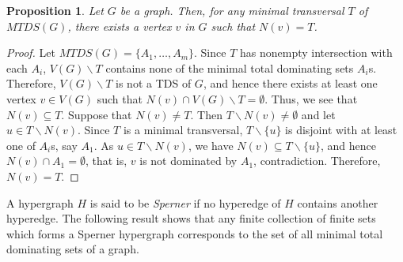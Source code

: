 \documentclass[11pt]{article}
\newtheorem{proposition}[theorem]{Proposition}
\theoremstyle{definition}
\begin{document}
\begin{proposition}\label{prop:transmtdsg}
Let $G$ be a graph.
Then, for any minimal transversal $T$ of $MTDS(G)$, there exists a vertex $v$ in $G$ such that $N(v)=T$.
\end{proposition}
\begin{proof}
Let $MTDS(G)=\{A_1,\dots,A_m\}$.
Since $T$ has nonempty intersection with each $A_i$,
$V(G)\backslash T$ contains none of the minimal total dominating sets $A_i$s.
Therefore, $V(G)\backslash T$ is not a TDS of $G$,
and hence there exists at least one vertex $v\in V(G)$ such that $N(v)\cap V(G)\backslash T=\emptyset$. 
Thus, we see that $N(v)\subseteq T$.
Suppose that $N(v)\neq T$.
Then $T\backslash N(v)\neq \emptyset$ and let $u\in T\backslash N(v)$.
Since $T$ is a minimal transversal, $T\backslash \{u\}$ is disjoint with at least one of $A_i$s, say $A_1$.
As $u\in T\backslash N(v)$, we have $N(v) \subseteq T\backslash \{u\}$,
and hence $N(v)\cap A_1=\emptyset$, that is, $v$ is not dominated by $A_1$, contradiction.
Therefore, $N(v)=T$.
\end{proof}

A hypergraph $H$ is said to be \emph{Sperner} if no hyperedge of $H$ contains another hyperedge.
The following result shows that any finite collection of finite sets which forms a Sperner hypergraph corresponds to the set of all minimal total dominating sets of a graph.
\end{document}
